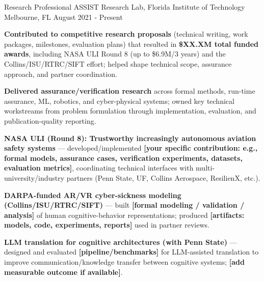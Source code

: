 


\begin{cventries}


\cventry
{Research Professional}
{ASSIST Research Lab, Florida Institute of Technology}
{Melbourne, FL}
{August 2021 - Present}
{
\begin{cvitems}
\item \textbf{Contributed to competitive research proposals} (technical writing, work packages, milestones, evaluation plans) that resulted in \textbf{\$XX.XM total funded awards}, including NASA ULI Round 8 (up to \$6.9M/3 years) and the Collins/ISU/RTRC/SIFT effort; helped shape technical scope, assurance approach, and partner coordination.
\item \textbf{Delivered assurance/verification research} across formal methods, run-time assurance, ML, robotics, and cyber-physical systems; owned key technical workstreams from problem formulation through implementation, evaluation, and publication-quality reporting.
\item \textbf{NASA ULI (Round 8): Trustworthy increasingly autonomous aviation safety systems} — developed/implemented \textbf{[your specific contribution: e.g., formal models, assurance cases, verification experiments, datasets, evaluation metrics]}, coordinating technical interfaces with multi-university/industry partners (Penn State, UF, Collins Aerospace, ResilienX, etc.).
\item \textbf{DARPA-funded AR/VR cyber-sickness modeling (Collins/ISU/RTRC/SIFT)} — built \textbf{[formal modeling / validation / analysis]} of human cognitive-behavior representations; produced \textbf{[artifacts: models, code, experiments, reports]} used in partner reviews.
\item \textbf{LLM translation for cognitive architectures (with Penn State)} — designed and evaluated \textbf{[pipeline/benchmarks]} for LLM-assisted translation to improve communication/knowledge transfer between cognitive systems; \textbf{[add measurable outcome if available]}.

\end{cvitems}}
\end{cventries}
